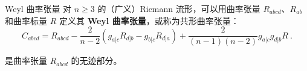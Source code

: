 


\begin{definition}{Weyl 曲率张量}
对 $n \ge 3$ 的（广义）Riemann 流形，可以用曲率张量 $R_{abcd}$、$R_{ab}$ 和曲率标量 $R$ 定义其 \textbf{Weyl 曲率张量}，或称为共形曲率张量：
\begin{equation}
C_{abcd} = R_{abcd} - \frac{2}{n-2} \left(g_{a[c}R_{d]b} - g_{b[c}R_{d]a}\right) + \frac{2}{(n-1)(n-2)} g_{a[c}g_{d]b} R ~.
\end{equation}

是曲率张量 $R_{abcd}$ 的无迹部分。
\end{definition}